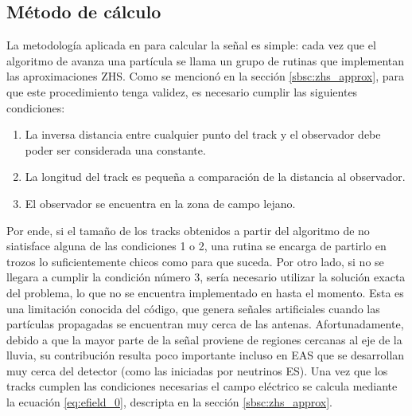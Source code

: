 		\subsection{M\'etodo de c\'alculo}
		
		La metodolog\'ia aplicada en \zhs{} para calcular la se\~nal es simple: cada vez que el algoritmo de \aires{} avanza una part\'icula se llama un grupo de rutinas que implementan las aproximaciones ZHS.
		Como se mencion\'o en la secci\'on \ref{sbsc:zhs_approx}, para que este procedimiento tenga validez, es necesario cumplir las siguientes condiciones:
		\begin{enumerate}
		\item La inversa distancia entre cualquier punto del track y el observador debe poder ser considerada una constante.
		\item La longitud del track es peque\~na a comparaci\'on de la distancia al observador.
		\item El observador se encuentra en la zona de campo lejano.
		\end{enumerate}
		Por ende, si el tama\~no de los tracks obtenidos a partir del algoritmo de \aires{} no siatisface alguna de las condiciones 1 o 2, una rutina se encarga de partirlo en trozos lo suficientemente chicos como para que suceda.
		Por otro lado, si no se llegara a cumplir la condici\'on n\'umero 3, ser\'ia necesario utilizar la soluci\'on exacta del problema, lo que no se encuentra implementado en \zhs{} hasta el momento.
		Esta es una limitaci\'on conocida del c\'odigo, que genera se\~nales artificiales cuando las part\'iculas propagadas se encuentran muy cerca de las antenas.
		Afortunadamente, debido a que la mayor parte de la se\~nal proviene de regiones cercanas al eje de la lluvia, su contribuci\'on resulta poco importante incluso en EAS que se desarrollan muy cerca del detector (como las iniciadas por neutrinos ES).
		Una vez que los tracks cumplen las condiciones necesarias el campo el\'ectrico se calcula mediante la ecuaci\'on \ref{eq:efield_0}, descripta en la secci\'on \ref{sbsc:zhs_approx}.
		
